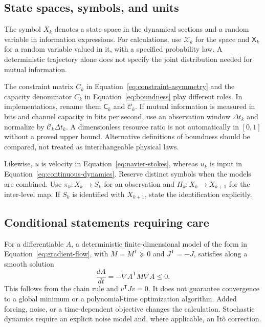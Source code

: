\documentclass[11pt]{article}
\newcommand{\Coarse}{\Pi}
\newcommand{\Projection}{\pi}
\theoremstyle{definition}
\theoremstyle{plain}
\theoremstyle{remark}
\begin{document}
\subsection{State spaces, symbols, and units}

The symbol $X_k$ denotes a state space in the dynamical sections and a random variable in information expressions. For calculations, use $\mathcal X_k$ for the space and $\mathsf X_k$ for a random variable valued in it, with a specified probability law. A deterministic trajectory alone does not specify the joint distribution needed for mutual information.

The constraint matrix $C_k$ in Equation~\eqref{eq:constraint-asymmetry} and the capacity denominator $C_k$ in Equation~\eqref{eq:boundness} play different roles. In implementations, rename them $\mathsf C_k$ and $\mathcal C_k$. If mutual information is measured in bits and channel capacity in bits per second, use an observation window $\Delta t_k$ and normalize by $\mathcal C_k\Delta t_k$. A dimensionless resource ratio is not automatically in $[0,1]$ without a proved upper bound. Alternative definitions of boundness should be compared, not treated as interchangeable physical laws.

Likewise, $u$ is velocity in Equation~\eqref{eq:navier-stokes}, whereas $u_k$ is input in Equation~\eqref{eq:continuous-dynamics}. Reserve distinct symbols when the models are combined. Use $\Projection_k:X_k\to S_k$ for an observation and $\Coarse_k:X_k\to X_{k+1}$ for the inter-level map. If $S_k$ is identified with $X_{k+1}$, state the identification explicitly.

\subsection{Conditional statements requiring care}

For a differentiable $A$, a deterministic finite-dimensional model of the form in Equation~\eqref{eq:gradient-flow}, with $M=M^{\mathsf T}\succeq0$ and $J^{\mathsf T}=-J$, satisfies along a smooth solution
\begin{equation}
 \frac{dA}{dt}=-\nabla A^{\mathsf T}M\nabla A\leq0.
\end{equation}
This follows from the chain rule and $v^{\mathsf T}Jv=0$. It does not guarantee convergence to a global minimum or a polynomial-time optimization algorithm. Added forcing, noise, or a time-dependent objective changes the calculation. Stochastic dynamics require an explicit noise model and, where applicable, an It\^o correction.
\end{document}
